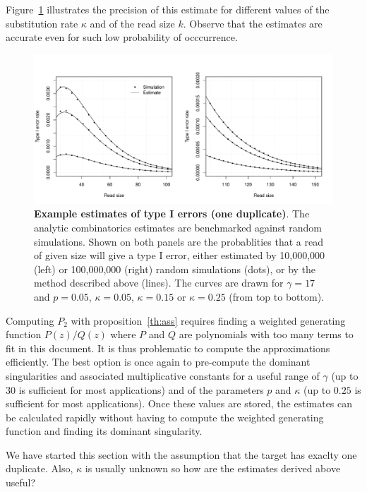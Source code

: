 \documentclass{article}
\begin{document}
Figure~\ref{fig:simulp_fp} illustrates the precision of this estimate for
different values of the substitution rate $\kappa$ and of the read size
$k$. Observe that the estimates are accurate even for such low probability
of occcurrence.


\begin{figure}[h]
\centering
\includegraphics[scale=0.445]{simulp_false_positives.pdf}
\caption{\textbf{Example estimates of type I errors (one
duplicate)}. The analytic combinatorics estimates are benchmarked against
random simulations. Shown on both panels are the probablities that a read
of given size will give a type I error, either estimated by 10,000,000
(left) or 100,000,000 (right) random simulations (dots), or by the method
described above (lines). The curves are drawn for $\gamma=17$ and
$p=0.05$, $\kappa=0.05$, $\kappa=0.15$ or $\kappa=0.25$ (from top to
bottom).}
\label{fig:simulp_fp}
\end{figure}

Computing $P_2$ with proposition~\ref{th:ass} requires finding a weighted
generating function $P(z)/Q(z)$ where $P$ and $Q$ are polynomials with too
many terms to fit in this document. It is thus problematic to compute the
approximations efficiently. The best option is once again to pre-compute
the dominant singularities and associated multiplicative constants for a
useful range of $\gamma$ (up to $30$ is sufficient for most applications)
and of the parameters $p$ and $\kappa$ (up to $0.25$ is sufficient for
most applications). Once these values are stored, the estimates can be
calculated rapidly without having to compute the weighted generating
function and finding its dominant singularity.

We have started this section with the assumption that the target has
exaclty one duplicate. Also, $\kappa$ is usually unknown so how are the
estimates derived above useful?
\end{document}
